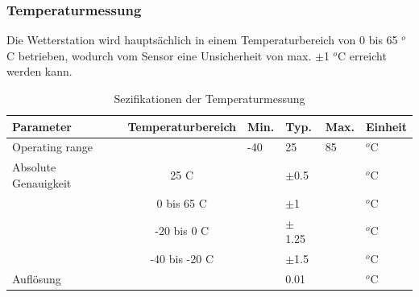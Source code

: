 \subsubsection*{Temperaturmessung}
Die Wetterstation wird hauptsächlich in einem Temperaturbereich von 0 bis 65 $^{o}$C betrieben, wodurch vom Sensor eine Unsicherheit von max. $\pm$1 $^{o}$C erreicht werden kann. \\
\begin{table}[htbp]
  \centering
  \caption{Sezifikationen der Temperaturmessung \cite{Bosch2019}}
    \begin{tabular}{llllll}
    \toprule
    \textbf{Parameter} & \multicolumn{1}{l}{\textbf{Temperaturbereich}} & \multicolumn{1}{l}{\textbf{Min.}} & \textbf{Typ. } & \multicolumn{1}{l}{\textbf{Max.}} & \textbf{Einheit} \\
    \midrule
    Operating range &       & \multicolumn{1}{l}{-40} & 25    & \multicolumn{1}{l}{85} & $^{o}$C \\
    Absolute Genauigkeit & \multicolumn{1}{c}{25 C} &       & $\pm$0.5 &       & $^{o}$C \\
          & \multicolumn{1}{c}{0 bis 65 C} &       & $\pm$1  &       & $^{o}$C \\
          & \multicolumn{1}{c}{-20 bis 0 C} &       & $\pm$1.25 &       & $^{o}$C \\
          & \multicolumn{1}{c}{-40 bis -20 C} &       & $\pm$1.5 &       & $^{o}$C \\
    Auflösung  &       &       & 0.01  &       & $^{o}$C \\
    \bottomrule
    \end{tabular}%
  \label{tab:spez_temp}%
\end{table}%


